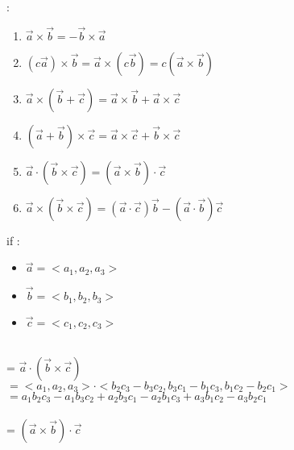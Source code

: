 \noindent{\color{smalt(darkpowderblue)}\rule{\linewidth}{.2mm}}
{} : 
\begin{enumerate}
\item  ${\overrightarrow{a}}\times{\overrightarrow{b}} = -{\overrightarrow{b}}\times{\overrightarrow{a}}$
\item $(c{\overrightarrow{a}})\times{\overrightarrow{b}} = {\overrightarrow{a}}\times (c{\overrightarrow{b}}) = c({\overrightarrow{a}}\times{\overrightarrow{b}}) $
\item ${\overrightarrow{a}}\times({\overrightarrow{b}} + \overrightarrow{c}) = {\overrightarrow{a}}\times{\overrightarrow{b}} + {\overrightarrow{a}}\times{\overrightarrow{c}}$
\item $(\overrightarrow{a} + \overrightarrow{b}) \times \overrightarrow{c} = {\overrightarrow{a}}\times{\overrightarrow{c}} + {\overrightarrow{b}}\times{\overrightarrow{c}}$
\item $\overrightarrow{a} \cdot (\overrightarrow{b} \times \overrightarrow{c}) = (\overrightarrow{a} \times \overrightarrow{b}) \cdot \overrightarrow{c}$
\item $\overrightarrow{a} \times (\overrightarrow{b} \times \overrightarrow{c}) = (\overrightarrow{a} \cdot \overrightarrow{c}) \overrightarrow{b} - (\overrightarrow{a} \cdot \overrightarrow{b})\overrightarrow{c}$
\end{enumerate}
{\color{smalt(darkpowderblue)}{Pf(5)}} if :
\begin{itemize}
\item $\overrightarrow{a} = <a_{1} , a_{2} , a_{3} >$
\item $\overrightarrow{b} = < b_{1} , b_{2} , b_{3} >$
\item $\overrightarrow{c} = <c_{1} , c_{2} , c_{3}>$
\end{itemize}
{}\\ = $\overrightarrow{a} \cdot (\overrightarrow{b} \times \overrightarrow{c})$\\
$= <a_{1},a_{2},a_{3}> \cdot <b_{2}c_{3} - b_{3}c_{2} , b_{3}c_{1} - b_{1}c_{3} , b_{1}c_{2} -b_{2}c_{1} >$\\
$= a_{1}b_{2}c_{3} - a_{1}b_{3}c_{2} + a_{2}b_{3}c_{1} - a_{2}b_{1}c_{3} + a_{3}b_{1}c_{2} - a_{3}b_{2}c_{1}$\\
{}\\ = $(\overrightarrow{a} \times \overrightarrow{b}) \cdot \overrightarrow{c}$\\
